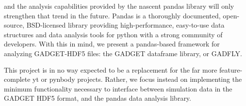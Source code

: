 and the analysis capabilities provided by the nascent pandas library will only strengthen that trend in the future.  Pandas is a thoroughly documented, open-source, BSD-licensed library providing high-performance, easy-to-use data structures and data analysis tools for python with a strong community of developers. With this in mind, we present a pandas-based framework for analyzing GADGET-HDF5 files: the GADGET dataframe library, or GADFLY.

This project is in no way expected to be a replacement for the far more feature-complete yt or pynbody projects. Rather, we focus instead on implementing the minimum functionality necessary to interface between simulation data in the GADGET HDF5 format, and the pandas data analysis library.%
